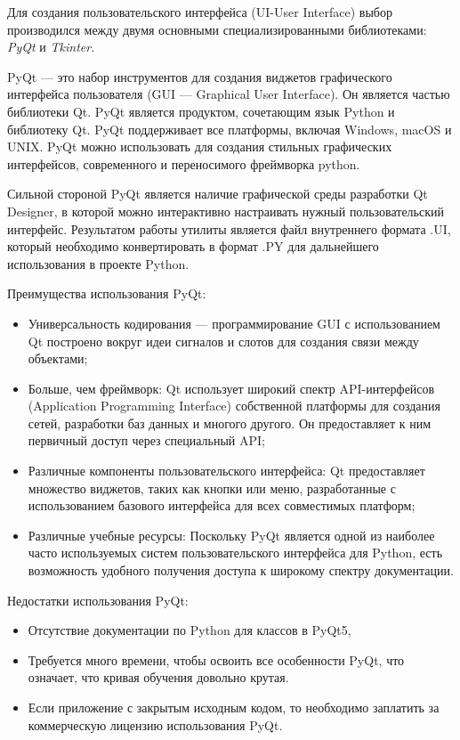 Для создания пользовательского интерфейса (UI-User Interface) выбор производился между двумя основными специализированными библиотеками: \textit{PyQt} и \textit{Tkinter}.

PyQt --- это набор инструментов для создания виджетов графического интерфейса пользователя (GUI --- Graphical User Interface). Он является частью библиотеки Qt. PyQt является продуктом, сочетающим язык Python и библиотеку Qt. PyQt поддерживает все платформы, включая Windows, macOS и UNIX. PyQt можно использовать для создания стильных графических интерфейсов, современного и переносимого фреймворка python.

Сильной стороной PyQt является наличие графической среды разработки Qt Designer, в которой можно интерактивно настраивать нужный пользовательский интерфейс. Результатом работы утилиты является файл внутреннего формата .UI, который необходимо конвертировать в формат .PY для дальнейшего использования в проекте Python.

Преимущества использования PyQt:
\begin{itemize}
	\item Универсальность кодирования --- программирование GUI с использованием Qt построено вокруг идеи сигналов и слотов для создания связи между объектами;
	\item Больше, чем фреймворк: Qt использует широкий спектр API-интерфейсов (Application Programming Interface) собственной платформы для создания сетей, разработки баз данных и многого другого. Он предоставляет к ним первичный доступ через специальный API;
	\item Различные компоненты пользовательского интерфейса: Qt предоставляет множество виджетов, таких как кнопки или меню, разработанные с использованием базового интерфейса для всех совместимых платформ;
	\item Различные учебные ресурсы: Поскольку PyQt является одной из наиболее часто используемых систем пользовательского интерфейса для Python, есть возможность удобного получения доступа к широкому спектру документации.
\end{itemize}

Недостатки использования PyQt:
\begin{itemize}
	\item Отсутствие документации по Python для классов в PyQt5,
	\item Требуется много времени, чтобы освоить все особенности PyQt, что означает, что кривая обучения довольно крутая.
	\item Если приложение с закрытым исходным кодом, то необходимо заплатить за коммерческую лицензию использования PyQt.
\end{itemize}

